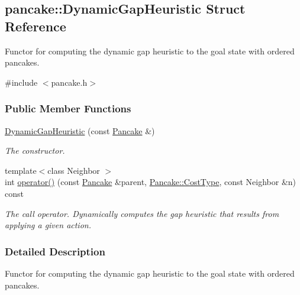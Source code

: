 \hypertarget{structpancake_1_1DynamicGapHeuristic}{}\subsection{pancake\+:\+:Dynamic\+Gap\+Heuristic Struct Reference}
\label{structpancake_1_1DynamicGapHeuristic}


Functor for computing the dynamic gap heuristic to the goal state with ordered pancakes.  




{\ttfamily \#include $<$pancake.\+h$>$}

\subsubsection*{Public Member Functions}
\begin{DoxyCompactItemize}
\item 
\hyperlink{structpancake_1_1DynamicGapHeuristic_addba213adf89db1683fba90684b54bac}{Dynamic\+Gap\+Heuristic} (const \hyperlink{structpancake_1_1Pancake}{Pancake} \&)\hypertarget{structpancake_1_1DynamicGapHeuristic_addba213adf89db1683fba90684b54bac}{}\label{structpancake_1_1DynamicGapHeuristic_addba213adf89db1683fba90684b54bac}

\begin{DoxyCompactList}\small\item\em The constructor. \end{DoxyCompactList}\item 
{\footnotesize template$<$class Neighbor $>$ }\\int \hyperlink{structpancake_1_1DynamicGapHeuristic_a78ce50ee47b6597d953ad6174aed6ae3}{operator()} (const \hyperlink{structpancake_1_1Pancake}{Pancake} \&parent, \hyperlink{structpancake_1_1Pancake_a77e54f565a48fd255a5ddf26850ec9ac}{Pancake\+::\+Cost\+Type}, const Neighbor \&n) const 
\begin{DoxyCompactList}\small\item\em The call operator. Dynamically computes the gap heuristic that results from applying a given action. \end{DoxyCompactList}\end{DoxyCompactItemize}


\subsubsection{Detailed Description}
Functor for computing the dynamic gap heuristic to the goal state with ordered pancakes. 

